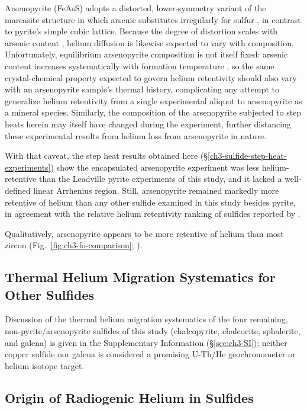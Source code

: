 Arsenopyrite (FeAsS) adopts a distorted, lower-symmetry variant of the
marcasite structure in which arsenic substitutes irregularly for sulfur
\citep{morimotoclark1961}, in contrast to pyrite's simple cubic lattice. 
Because the degree of distortion scales with arsenic content \citep{morimotoclark1961},
helium diffusion is likewise expected to vary with composition. 
Unfortunately, equilibrium arsenopyrite composition is not
itself fixed: arsenic content increases systematically with formation
temperature \citep{barton1969,morimotoclark1961}, so the same
crystal-chemical property expected to govern helium retentivity should
also vary with an arsenopyrite sample's thermal history, complicating
any attempt to generalize helium retentivity from a single experimental
aliquot to arsenopyrite as a mineral species. Similarly, the composition of the arsenopyrite subjected to
step heats herein may itself have changed during the experiment, further distancing 
these experimental results from helium loss from arsenopyrite in nature.

With that caveat, the step heat results obtained here
(\S\ref{ch3-sulfide-step-heat-experiments}) show the encapsulated arsenopyrite
experiment was less helium-retentive than the Leadville pyrite experiments of this
study, and it lacked a well-defined linear Arrhenius region. Still, arsenopyrite remained markedly more
retentive of helium than any other sulfide examined in this study besides pyrite, 
in agreement with the relative helium retentivity ranking of sulfides
reported by \citet{yakubovich2019}.

Qualitatively, arsenopyrite appears to be more retentive of helium than most zircon (Fig.~\ref{fig:ch3-fo-comparison}; \citealp{guenthner2013}).

\subsection{Thermal Helium Migration Systematics for Other Sulfides}

Discussion of the thermal helium migration systematics of the four
remaining, non-pyrite/arsenopyrite sulfides of this study (chalcopyrite,
chalcocite, sphalerite, and galena) is given in the Supplementary Information
(\S\ref{sec:ch3-SI}); neither copper sulfide nor galena is considered a
promising U-Th/He geochronometer or helium isotope target.

\subsection{Origin of Radiogenic Helium in Sulfides}\label{ch3-discussion-radiogenic-he-origin}

